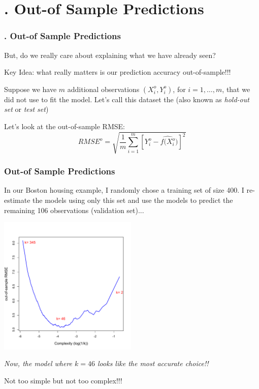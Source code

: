 \documentclass[flegn]{beamer}
\newcommand{\sko}{\vspace{.1in}}
\newcommand{\skoo}{\vspace{.2in}}
\begin{document}
\section{. Out-of Sample Predictions}
\begin{frame}
\frametitle{. Out-of Sample Predictions}
But, do we really care about explaining what we have already seen?

\skoo

{\color{blue}Key Idea:} what really matters is our prediction accuracy {\color{red}out-of-sample!!!}

\skoo
Suppose we have $m$ additional observations $(X^o_i,Y^o_i)$, for $i=1,\dots,m$, {\color{blue}that we did not use to fit the model.} Let's call this dataset the {\color{red}{\it validation set} }(also known as {\it hold-out set} or {\it test set}) 

\skoo
Let's look at the out-of-sample RMSE:
$$
RMSE^o = \sqrt{\frac{1}{m} \sum_{i=1}^m \left[Y^o_i - \widehat{f(X^o_i})\right]^2}
$$

\end{frame}


\begin{frame}
\frametitle{Out-of Sample Predictions}
In our Boston housing example, I randomly chose a training set of size 400. I re-estimate the models using only this set and use the models to predict the remaining 106 observations (validation set)...

\vspace{-0.3cm}
\begin{minipage}{2.5in}
\begin{center}
\includegraphics[width=2.6in]{BostonRMSE_OOS}
\end{center}
\end{minipage}
\begin{minipage}{1.5in}

{\color{blue}\it Now, the model where $k=46$ looks like the most accurate choice!!}

\sko

{\color{red}Not too simple but not too complex!!!}
\end{minipage}

\end{frame}
\end{document}

